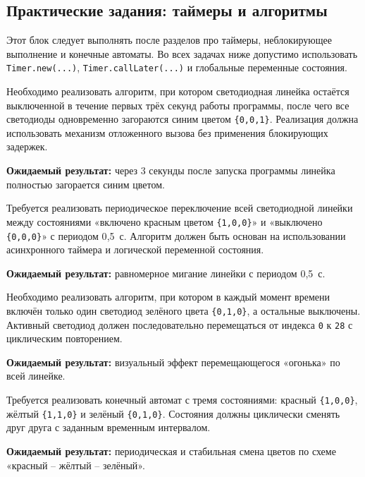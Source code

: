 \subsection{Практические задания: таймеры и алгоритмы}
Этот блок следует выполнять после разделов про таймеры, неблокирующее выполнение и конечные автоматы. Во всех задачах ниже допустимо использовать \verb|Timer.new(...)|, \verb|Timer.callLater(...)| и глобальные переменные состояния.

\begin{taskbox}
\indent Необходимо реализовать алгоритм, при котором светодиодная линейка остаётся выключенной в течение первых трёх секунд работы программы, после чего все светодиоды одновременно загораются синим цветом \verb|{0,0,1}|. Реализация должна использовать механизм отложенного вызова без применения блокирующих задержек.

\noindent\textbf{Ожидаемый результат:} через 3 секунды после запуска программы линейка полностью загорается синим цветом.
\end{taskbox}

\begin{taskbox}
\indent Требуется реализовать периодическое переключение всей светодиодной линейки между состояниями «включено красным цветом \verb|{1,0,0}|» и «выключено \verb|{0,0,0}|» с периодом 0{,}5~с. Алгоритм должен быть основан на использовании асинхронного таймера и логической переменной состояния.

\noindent\textbf{Ожидаемый результат:} равномерное мигание линейки с периодом 0{,}5~с.
\end{taskbox}

\begin{taskbox}
\indent Необходимо реализовать алгоритм, при котором в каждый момент времени включён только один светодиод зелёного цвета \verb|{0,1,0}|, а остальные выключены. Активный светодиод должен последовательно перемещаться от индекса \verb|0| к \verb|28| с циклическим повторением.

\noindent\textbf{Ожидаемый результат:} визуальный эффект перемещающегося «огонька» по всей линейке.
\end{taskbox}

\begin{taskbox}
\indent Требуется реализовать конечный автомат с тремя состояниями: красный \verb|{1,0,0}|, жёлтый \verb|{1,1,0}| и зелёный \verb|{0,1,0}|. Состояния должны циклически сменять друг друга с заданным временным интервалом.

\noindent\textbf{Ожидаемый результат:} периодическая и стабильная смена цветов по схеме «красный -- жёлтый -- зелёный».
\end{taskbox}

